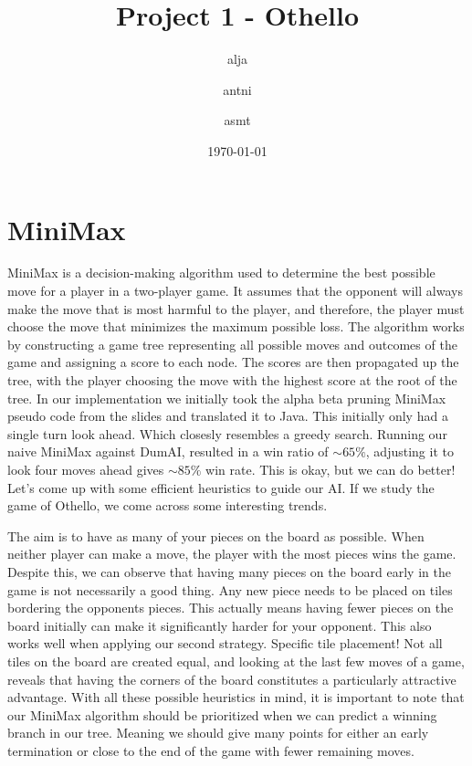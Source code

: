 \documentclass{article}
\title{Project 1 - Othello}
\author{alja \and antni \and asmt}
\date{\today}
\begin{document}
\maketitle
\section{MiniMax}

MiniMax is a decision-making algorithm used to determine the best possible move for a player in a two-player game. It assumes that the opponent will always make the move that is most harmful to the player, and therefore, the player must choose the move that minimizes the maximum possible loss. The algorithm works by constructing a game tree representing all possible moves and outcomes of the game and assigning a score to each node. The scores are then propagated up the tree, with the player choosing the move with the highest score at the root of the tree. In our implementation we initially took the alpha beta pruning MiniMax pseudo code from the slides and translated it to Java. This initially only had a single turn look ahead. Which closesly resembles a greedy search. Running our naive MiniMax against DumAI, resulted in a win ratio of $\sim 65\%$, adjusting it to look four moves ahead gives $\sim 85\%$ win rate. This is okay, but we can do better! Let's come up with some efficient heuristics to guide our AI.
If we study the game of Othello, we come across some interesting trends.

\vspace{1em}
The aim is to have as many of your pieces on the board as possible. When neither player can make a move, the player with the most pieces wins the game. Despite this, we can observe that having many pieces on the board early in the game is not necessarily a good thing. Any new piece needs to be placed on tiles bordering the opponents pieces. This actually means having fewer pieces on the board initially can make it significantly harder for your opponent. This also works well when applying our second strategy. Specific tile placement! Not all tiles on the board are created equal, and looking at the last few moves of a game, reveals that having the corners of the board constitutes a particularly attractive advantage. With all these possible heuristics in mind, it is important to note that our MiniMax algorithm should be prioritized when we can predict a winning branch in our tree. Meaning we should give many points for either an early termination or close to the end of the game with fewer remaining moves.
\newpage
\end{document}
